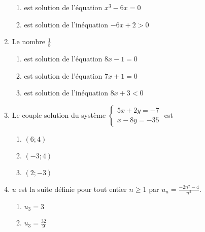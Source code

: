 \documentclass[oneside,twocolumn,landscape]{book}
\begin{document}
\begin{enumerate}
\begin{enumerate}
\item\BonneReponse est solution de l'équation $x^{3}-6x=0$

\item\MauvaiseReponse est solution de l'inéquation $-6x+2>0$

\end{enumerate}

\newpage

\item Le nombre $\frac{1}{8}$

\begin{enumerate}

\item\BonneReponse est solution de l'équation $8x-1=0$

\item\MauvaiseReponse est solution de l'équation $7x+1=0$


\item\MauvaiseReponse est solution de l'inéquation $8x+3<0$

\end{enumerate}



\item Le couple solution du système $\left\{\begin{array}{c}5x+2y=-7 \\ x-8y=-35\end{array}\right.$ est

\begin{enumerate}

\item\MauvaiseReponse $(6;4)$

\item\BonneReponse $(-3 ;4)$

\item\MauvaiseReponse $(2 ; -3)$


\end{enumerate}






\item $u$ est la suite définie pour tout entier $n \geqslant 1$ par $u_{n}=\frac{-2n^{2}-4}{n^{2}}$.

\begin{enumerate}

\item\MauvaiseReponse $u_{3}=3$


\item\MauvaiseReponse $u_{3} =\frac{32}{9}$


\end{enumerate}
\end{enumerate}
\end{document}
